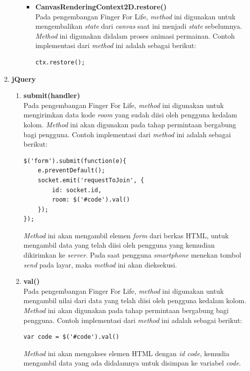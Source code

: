 \begin{enumerate}
\begin{enumerate}
\begin{itemize}
			\item \textbf{CanvasRenderingContext2D.restore()} \\
			Pada pengembangan Finger For Life, \textit{method} ini digunakan untuk mengembalikan \textit{state} dari \textit{canvas} saat ini menjadi \textit{state} sebelumnya. \textit{Method} ini digunakan didalam proses animasi permainan. Contoh implementasi dari \textit{method} ini adalah sebagai berikut:
\begin{lstlisting}[caption={Implementasi \textit{method save()}}]
ctx.restore();
\end{lstlisting}
		\end{itemize}
	\end{enumerate}
	
	\item \textbf{jQuery} 
	\begin{enumerate}
		\item \textbf{submit(handler)} \\
		Pada pengembangan Finger For Life, \textit{method} ini digunakan untuk mengirimkan data kode \textit{room} yang sudah diisi oleh pengguna kedalam kolom. \textit{Method} ini akan digunakan pada tahap permintaan bergabung bagi pengguna. Contoh implementasi dari \textit{method} ini adalah sebagai berikut:
\begin{lstlisting}[caption={Implementasi \textit{method .submit()}}]
$('form').submit(function(e){
	e.preventDefault();
	socket.emit('requestToJoin', {
		id: socket.id,
		room: $('#code').val()
	});
});
\end{lstlisting}
\textit{Method} ini akan mengambil elemen \textit{form} dari berkas HTML, untuk mengambil data yang telah diisi oleh pengguna yang kemudian dikirimkan ke \textit{server}. Pada saat pengguna \textit{smartphone} menekan tombol \textit{send} pada layar, maka \textit{method} ini akan dieksekusi.
		
		\item \textbf{val()} \\
		Pada pengembangan Finger For Life, \textit{method} ini digunakan untuk mengambil nilai dari data yang telah diisi oleh pengguna kedalam kolom. \textit{Method} ini akan digunakan pada tahap permintaan bergabung bagi pengguna. Contoh implementasi dari \textit{method} ini adalah sebagai berikut:
\begin{lstlisting}[caption={Implementasi \textit{method val()}}]
var code = $('#code').val()
\end{lstlisting}
		\textit{Method} ini akan mengakses elemen HTML dengan \textit{id code}, kemudia mengambil data yang ada didalamnya untuk disimpan ke variabel \textit{code}.
		

\end{enumerate}
\end{enumerate}
